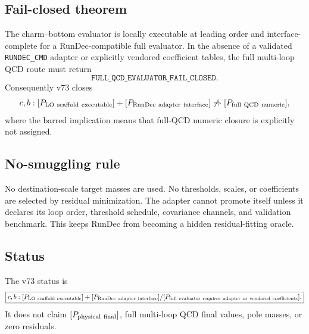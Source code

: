 \subsection{Fail-closed theorem}
\begin{theorem}
The charm--bottom evaluator is locally executable at leading order and interface-complete for a RunDec-compatible full evaluator. In the absence of a validated \texttt{RUNDEC\_CMD} adapter or explicitly vendored coefficient tables, the full multi-loop QCD route must return
\[
\boxed{\texttt{FULL\_QCD\_EVALUATOR\_FAIL\_CLOSED}}.
\]
Consequently v73 closes
\[
 c,b:[P_{\rm LO\ scaffold\ executable}]+[P_{\rm RunDec\ adapter\ interface}]
 \not\Rightarrow [P_{\rm full\ QCD\ numeric}],
\]
where the barred implication means that full-QCD numeric closure is explicitly not assigned.
\end{theorem}

\subsection{No-smuggling rule}
No destination-scale target masses are used. No thresholds, scales, or coefficients are selected by residual minimization. The adapter cannot promote itself unless it declares its loop order, threshold schedule, covariance channels, and validation benchmark. This keeps RunDec from becoming a hidden residual-fitting oracle.

\subsection{Status}
The v73 status is
\[
\boxed{c,b:[P_{\rm LO\ scaffold\ executable}]+[P_{\rm RunDec\ adapter\ interface}]/[P_{\rm full\ evaluator\ requires\ adapter\ or\ vendored\ coefficients}].}
\]
It does not claim \([P_{\rm physical\ final}]\), full multi-loop QCD final values, pole masses, or zero residuals.
